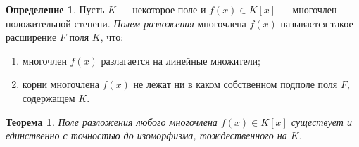 \documentclass[a4paper]{article}
\theoremstyle{plain}
\newtheorem*{theorem}{Теорема}
\theoremstyle{definition}
\newtheorem{definition}{Определение}
\numberwithin{definition}{section}
\numberwithin{proposal}{section}
\begin{document}
\begin{definition}
Пусть \(K\) --- некоторое поле и \(f(x) \in K[x]\) --- многочлен положительной степени. \emph{Полем разложения} многочлена \(f(x)\) называется такое расширение \(F\) поля \(K\), что:
\begin{enumerate}
	\item многочлен \(f(x)\) разлагается на линейные множители;
	\item корни многочлена \(f(x)\) не лежат ни в каком собственном подполе поля \(F\), содержащем \(K\).
\end{enumerate}
\end{definition}

\begin{theorem}
Поле разложения любого многочлена \(f(x) \in K[x]\) существует и единственно с точностью до изоморфизма, тождественного на \(K\).
\end{theorem}
\end{document}
